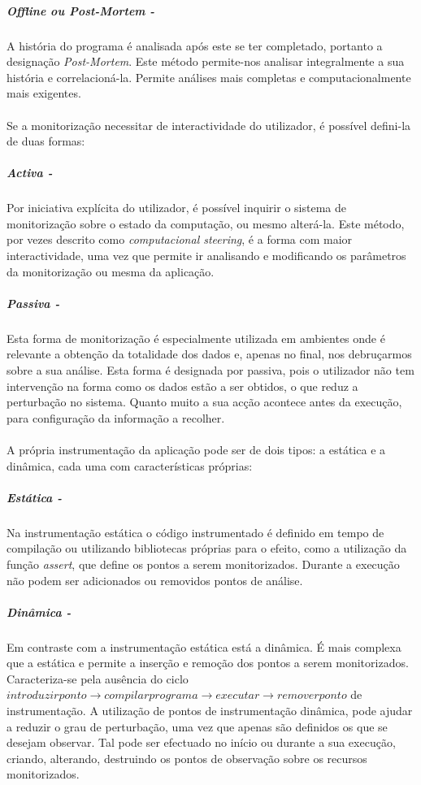 \subparagraph*{Offline ou \textit{Post-Mortem} - }

A história do programa é analisada após este se ter completado, portanto a designação \textit{Post-Mortem}.
Este método permite-nos analisar integralmente a sua história e correlacioná-la.
Permite análises mais completas e computacionalmente mais exigentes.

\paragraph*{}

Se a monitorização necessitar de interactividade do utilizador, é possível defini-la de duas formas:

\subparagraph*{Activa - }

Por iniciativa explícita do utilizador, é possível inquirir o sistema de monitorização sobre o estado da computação, ou mesmo alterá-la.
Este método, por vezes descrito como \textit{computacional steering}, é a forma com maior interactividade, uma vez que permite ir analisando e modificando os parâmetros da monitorização ou mesma da aplicação.

\subparagraph*{Passiva - }
Esta forma de monitorização é especialmente utilizada em ambientes onde é relevante a obtenção da totalidade dos dados e, apenas no final, nos debruçarmos sobre a sua análise.
Esta forma é designada por passiva, pois o utilizador não tem intervenção na forma como os dados estão a ser obtidos, o que reduz a perturbação no sistema.
Quanto muito a sua acção acontece antes da execução, para configuração da informação a recolher.

\paragraph*{}
A própria instrumentação da aplicação pode ser de dois tipos: a estática e a dinâmica, cada uma com características próprias:

\subparagraph*{Estática - }

Na instrumentação estática o código instrumentado é definido em tempo de compilação ou utilizando bibliotecas próprias para o efeito, como a utilização da função \textit{assert}, que define os pontos a serem monitorizados.
Durante a execução não podem ser adicionados ou removidos pontos de análise.

\subparagraph*{Dinâmica - }

Em contraste com a instrumentação estática está a dinâmica.
É mais complexa que a estática e permite a inserção e remoção dos pontos a serem monitorizados.
Caracteriza-se pela ausência do ciclo $introduzir ponto\rightarrow compilar programa\rightarrow executar\rightarrow remover ponto$ de instrumentação.
A utilização de pontos de instrumentação dinâmica, pode ajudar a reduzir o grau de perturbação, uma vez que apenas são definidos os que se desejam observar.
Tal pode ser efectuado no início ou durante a sua execução, criando, alterando, destruindo os pontos de observação sobre os recursos monitorizados.


